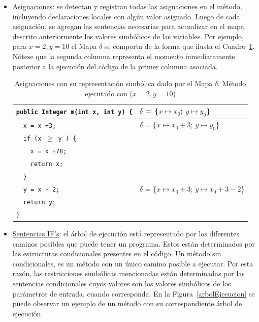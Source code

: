 \documentclass{llncs}
\begin{document}
\begin{itemize}
  \item \underline{Asignaciones}: se detectan y registran todas las asignaciones en el método, incluyendo declaraciones locales con algún valor asignado. Luego
  de cada asignación, se agregan las sentencias necesarias para actualizar en el mapa descrito anteriormente los valores simbólicos de las variables.
  Por ejemplo, para $x=2, y=10$ el Mapa $\delta$ se comporta de la forma que ilusta el Cuadro~\ref{cuadro-asignaciones}. Nótese que la segunda columna representa el momento
  inmediatamente posterior a la ejecución del código de la primer columna asociada.
      \begin{table}
	\centering
	\begin{tabular}{|m{5.5cm} | m{5cm}|}
	  \hline
	  \texttt{public Integer m(int x, int y) \{}  & $\delta$ = \{$x \mapsto x_0$; $y \mapsto y_0$\}\\
	  \hline
	  \ \ \texttt{x = x +3;} 		      & $\delta$ = \{$x \mapsto x_0 + 3$; $y \mapsto y_0$\}\\
	  \hline
	  \ \ \texttt{if (x $\geq$ y ) \{}	      &  \\
	  \hline
	  \ \ \ \ \texttt{x = x +78;} 		      & \\
	  \hline
	  \ \ \ \ \texttt{return x;} 		      & \\
	  \hline
	  \ \ \texttt{\}} 			      & \\
	  \hline
	  \ \ \texttt{y = x - 2;} 		      & $\delta$ = \{$x \mapsto x_0 + 3$; $y \mapsto x_0 +3 - 2$\}\\
	  \hline
	  \ \ \texttt{return y}; 		      & \\
	  \hline
	  \texttt{\}} 				      & \\
	  \hline
	\end{tabular}
	\centering
	\caption{Asignaciones con su representación simbólica dado por el Mapa $\delta$. Método ejecutado con ($x=2, y=10$)}
	\label{cuadro-asignaciones}
      \end{table}

  \item \underline{Sentencias IF’s}: el árbol de ejecución está representado por los diferentes caminos posibles que puede tener un programa. Estos están determinados por las estructuras condicionales presentes en el código. Un método sin condicionales, es un método con un único camino posible a ejecutar. Por esta razón, las restricciones simbólicas mencionadas están determinadas por las sentencias condicionales cuyos valores son los valores simbólicos de los parámetros de entrada, cuando corresponda. En la Figura~\ref{arbolEjecucion} se puede observar un ejemplo de un método con su correspondiente árbol de ejecución.
  

\end{itemize}
\end{document}
